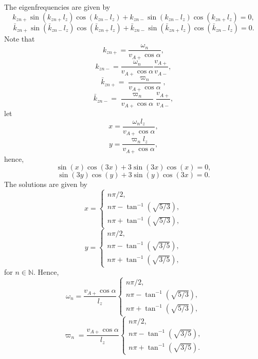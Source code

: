 \documentclass{article}
\begin{document}
The eigenfrequencies are given by
\[k_{zn+}\sin(k_{zn+}l_z)\cos(k_{zn-}l_z)+k_{zn-}\sin(k_{zn-}l_z)\cos(k_{zn+}l_z)=0,\]
\[\bar{k}_{zn+}\sin(\bar{k}_{zn-}l_z)\cos(\bar{k}_{zn+}l_z)+\bar{k}_{zn-}\sin(\bar{k}_{zn+}l_z)\cos(\bar{k}_{zn-}l_z)=0.\]
Note that
\[k_{zn+} = \frac{\omega_n}{v_{A+}\cos\alpha},\]
\[k_{zn-} = \frac{\omega_n}{v_{A+}\cos\alpha}\frac{v_{A+}}{v_{A-}},\]
\[\bar{k}_{zn+} = \frac{\varpi_n}{v_{A+}\cos\alpha},\]
\[\bar{k}_{zn-} = \frac{\varpi_n}{v_{A+}\cos\alpha}\frac{v_{A+}}{v_{A-}},\]
let
\[x = \frac{\omega_n l_z}{v_{A+}\cos\alpha},\]
\[y = \frac{\varpi_n l_z}{v_{A+}\cos\alpha},\]
hence,
\[\sin(x)\cos(3x)+3\sin(3x)\cos(x)=0,\]
\[\sin(3y)\cos(y)+3\sin(y)\cos(3x)=0.\]
The solutions are given by
\[x = \begin{cases}
n\pi/2, \\
n\pi - \tan^{-1}(\sqrt{5/3}), \\
n\pi + \tan^{-1}(\sqrt{5/3}),
\end{cases}\]
\[y = \begin{cases}
n\pi/2, \\
n\pi - \tan^{-1}(\sqrt{3/5}), \\
n\pi + \tan^{-1}(\sqrt{3/5}),
\end{cases}\]
for $n\in\mathds{N}$.
Hence,
\[\omega_n = \frac{v_{A+}\cos\alpha}{l_z}\begin{cases}
n\pi/2, \\
n\pi - \tan^{-1}(\sqrt{5/3}), \\
n\pi + \tan^{-1}(\sqrt{5/3}),
\end{cases}\]
\[\varpi_n = \frac{v_{A+}\cos\alpha}{l_z}\begin{cases}
n\pi/2, \\
n\pi - \tan^{-1}(\sqrt{3/5}), \\
n\pi + \tan^{-1}(\sqrt{3/5}).
\end{cases}\]
\end{document}
